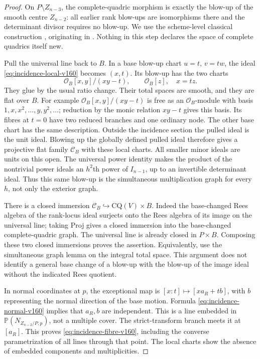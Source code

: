\documentclass[11pt,reqno]{amsart}
\numberwithin{equation}{section}
\theoremstyle{definition}\newtheorem{definition}[theorem]{Definition}
\theoremstyle{remark}\newtheorem{remark}[theorem]{Remark}
\newcommand{\Pj}{\mathbb P}\newcommand{\A}{\mathbb A}
\newcommand{\OO}{\mathcal O}\newcommand{\II}{\mathcal I}
\begin{document}
\begin{proof}
On $P\setminus Z_{n-3}$, the complete-quadric morphism is exactly the
blow-up of the smooth centre $Z_{n-2}$: all earlier rank blow-ups
are isomorphisms there and the determinant divisor requires no
blow-up. We use the scheme-level classical construction
\cite[Remark~2.5 and Construction~2.6]{Massarenti2020}, originating
in \cite[Theorem~6.3]{Vainsencher1982}. Nothing in this step declares
the space of complete quadrics itself new.

Pull the universal line back to $B$. In a base blow-up chart
$u=t$, $v=tw$, the ideal \eqref{eq:incidence-local-v160} becomes
$(x,t)$. Its blow-up has the two charts
\[
        \OO_B[x,y]/(xy-t),\qquad \OO_B[z],\quad x=tz.
\]
They glue by the usual ratio change. Their total spaces are smooth,
and they are flat over $B$. For example
$\OO_B[x,y]/(xy-t)$ is free as an $\OO_B$-module with basis
$1,x,x^2,\ldots,y,y^2,\ldots$; reduction by the monic relation $xy-t$
gives this basis. Its fibres at $t=0$ have two reduced branches and
one ordinary node. The other base chart has the same description.
Outside the incidence section the pulled ideal is the unit ideal.
Blowing up the globally defined pulled ideal therefore gives a
projective flat family $\mathcal C_B$ with these local charts.
All smaller minor ideals are units on this open. The universal power
identity makes the product of the nontrivial power ideals an
$h^2$th power of $I_{n-1}$, up to an invertible determinant ideal.
Thus this same blow-up is the simultaneous multiplication graph
for every $h$, not only the exterior graph.

There is a closed immersion
$\mathcal C_B\hookrightarrow\mathrm{CQ}(V)\times B$. Indeed the
base-changed Rees algebra of the rank-locus ideal surjects onto the
Rees algebra of its image on the universal line; taking Proj gives
a closed immersion into the base-changed complete-quadric graph.
The universal line is already closed in $P\times B$. Composing these
two closed immersions proves the assertion. Equivalently, use the
simultaneous graph lemma on the integral total space. This argument
does not identify a general base change of a blow-up with the blow-up
of the image ideal without the indicated Rees quotient.

In normal coordinates at $p$, the exceptional map is
$[x:t]\mapsto[x a_R+t b]$, with $b$ representing the normal direction
of the base motion. Formula \eqref{eq:incidence-normal-v160} implies
that $a_R,b$ are independent. This is a line embedded in
$\Pj(N_{Z_{n-2}/P,p})$, not a multiple cover. The strict-transform
branch meets it at $[a_R]$. This proves
\eqref{eq:incidence-fibre-v160}, including the converse parametrization
of all lines through that point. The local charts show the absence
of embedded components and multiplicities.


\end{proof}
\end{document}
